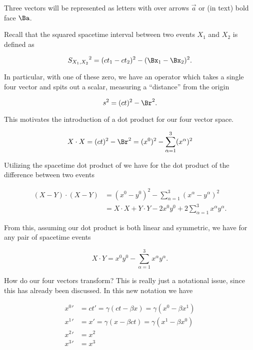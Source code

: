 Three vectors will be represented as letters with over arrows $\vec{a}$ or (in text) bold face $\Ba$.

Recall that the squared spacetime interval between two events $X_1$ and $X_2$ is defined as

\begin{equation}\label{eqn:relativisticElectrodynamicsT1:60}
{S_{X_1, X_2}}^2 = (ct_1 - c t_2)^2 - (\Bx_1 - \Bx_2)^2.
\end{equation}

In particular, with one of these zero, we have an operator which takes a single four vector and spits out a scalar, measuring a ``distance'' from the origin

\begin{equation}\label{eqn:relativisticElectrodynamicsT1:30}
s^2 = (ct)^2 - \Br^2.
\end{equation}

This motivates the introduction of a dot product for our four vector space.  

\begin{equation}\label{eqn:relativisticElectrodynamicsT1:50}
X \cdot X = (ct)^2 - \Br^2 = (x^0)^2 - \sum_{\alpha=1}^3 (x^\alpha)^2
\end{equation}

Utilizing the spacetime dot product of  we have for the dot product of the difference between two events

\begin{align*}
(X - Y) \cdot (X - Y)
&=
(x^0 - y^0)^2 - \sum_{\alpha =1}^3 (x^\alpha - y^\alpha)^2 \\
&=
X \cdot X + Y \cdot Y - 2 x^0 y^0 + 2 \sum_{\alpha =1}^3 x^\alpha y^\alpha.
\end{align*}

From this, assuming our dot product  is both linear and symmetric, we have for any pair of spacetime events

\begin{equation}\label{eqn:relativisticElectrodynamicsT1:55}
X \cdot Y = x^0 y^0 - \sum_{\alpha =1}^3 x^\alpha y^\alpha.
\end{equation}

How do our four vectors transform?  This is really just a notational issue, since this has already been discussed.  In this new notation we have

\begin{align}\label{eqn:relativisticElectrodynamicsT1:90}
{x^0}' &= ct' = \gamma ( ct - \beta x) = \gamma ( x^0 - \beta x^1 ) \\
{x^1}' &= x' = \gamma ( x - \beta ct ) = \gamma ( x^1 - \beta x^0 ) \\
{x^2}' &= x^2 \\
{x^3}' &= x^3
\end{align}

